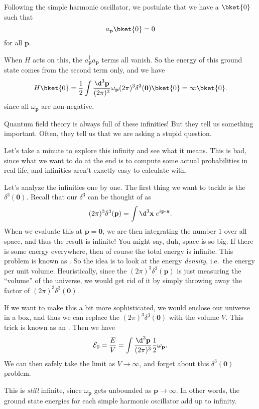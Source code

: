 \documentclass[a4paper]{article}
\begin{document}
Following the simple harmonic oscillator, we postulate that we have a  $\bket{0}$ such that
\[
  a_\mathbf{p} \bket{0} = 0
\]
for all $\mathbf{p}$.

When $H$ acts on this, the $a_\mathbf{p}^\dagger a_\mathbf{p}$ terms all vanish. So the energy of this ground state comes from the second term only, and we have
\[
  H\bket{0} = \frac{1}{2}\int \frac{\d^3 \mathbf{p}}{(2\pi)^3} \omega_\mathbf{p} (2\pi)^3 \delta^3(\mathbf{0}) \bket{0} = \infty\bket{0}.
\]
since all $\omega_\mathbf{p}$ are non-negative.

Quantum field theory is always full of these infinities! But they tell us something important. Often, they tell us that we are asking a stupid question.

Let's take a minute to explore this infinity and see what it means. This is bad, since what we want to do at the end is to compute some actual probabilities in real life, and infinities aren't exactly easy to calculate with.

Let's analyze the infinities one by one. The first thing we want to tackle is the $\delta^3(\mathbf{0})$. Recall that our $\delta^3$ can be thought of as
\[
  (2\pi)^3 \delta^3(\mathbf{p}) = \int \d^3 \mathbf{x}\; e^{i\mathbf{p}\cdot \mathbf{x}}.
\]
When we evaluate this at $\mathbf{p} = \mathbf{0}$, we are then integrating the number $1$ over all space, and thus the result is infinite! You might say, duh, space is so big. If there is some energy everywhere, then of course the total energy is infinite. This problem is known as . So the idea is to look at the energy \emph{density}, i.e.\ the energy per unit volume. Heuristically, since the $(2\pi)^3\delta^3(\mathbf{p})$ is just measuring the ``volume'' of the universe, we would get rid of it by simply throwing away the factor of $(2\pi)^3 \delta^3(\mathbf{0})$.

If we want to make this a bit more sophisticated, we would enclose our universe in a box, and thus we can replace the $(2\pi)^3\delta^3(\mathbf{0})$ with the volume $V$. This trick is known as an . Then we have
\[
  \mathcal{E}_0 = \frac{E}{V} = \int \frac{\d^3 \mathbf{p}}{(2\pi)^3} \frac{1}{2} \omega_\mathbf{p}.
\]
We can then safely take the limit as $V \to \infty$, and forget about this $\delta^3(\mathbf{0})$ problem.

This is \emph{still} infinite, since $\omega_\mathbf{p}$ gets unbounded as $\mathbf{p} \to \infty$. In other words, the ground state energies for each simple harmonic oscillator add up to infinity.
\end{document}
